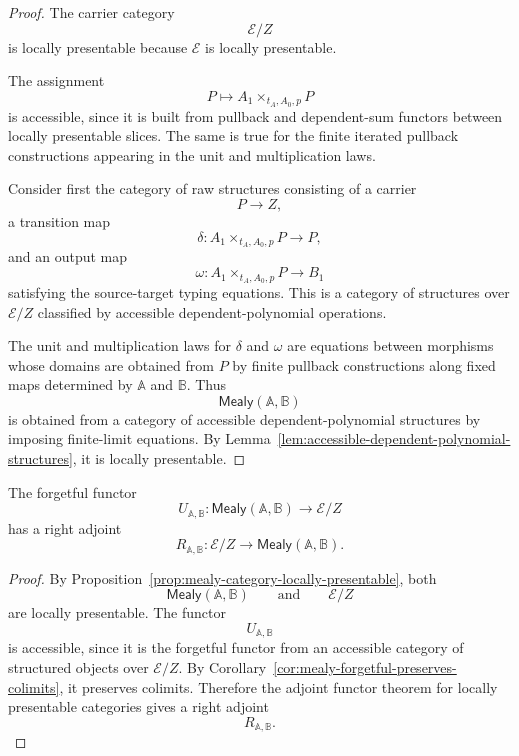 \begin{proof}
The carrier category
\[
\mathcal E/Z
\]
is locally presentable because \(\mathcal E\) is locally presentable.

The assignment
\[
P\longmapsto A_1\times_{t_A,A_0,p}P
\]
is accessible, since it is built from pullback and dependent-sum functors
between locally presentable slices. The same is true for the finite iterated
pullback constructions appearing in the unit and multiplication laws.

Consider first the category of raw structures consisting of a carrier
\[
P\to Z,
\]
a transition map
\[
\delta:A_1\times_{t_A,A_0,p}P\to P,
\]
and an output map
\[
\omega:A_1\times_{t_A,A_0,p}P\to B_1
\]
satisfying the source-target typing equations. This is a category of
structures over \(\mathcal E/Z\) classified by accessible
dependent-polynomial operations.

The unit and multiplication laws for \(\delta\) and \(\omega\) are equations
between morphisms whose domains are obtained from \(P\) by finite pullback
constructions along fixed maps determined by \(\mathbb A\) and \(\mathbb B\).
Thus
\[
\mathsf{Mealy}(\mathbb A,\mathbb B)
\]
is obtained from a category of accessible dependent-polynomial structures by
imposing finite-limit equations. By
Lemma~\ref{lem:accessible-dependent-polynomial-structures}, it is locally
presentable.
\end{proof}

\begin{theorem}
\label{thm:cofree-mealy-systems}
The forgetful functor
\[
U_{\mathbb A,\mathbb B}:
\mathsf{Mealy}(\mathbb A,\mathbb B)
\to
\mathcal E/Z
\]
has a right adjoint
\[
R_{\mathbb A,\mathbb B}:
\mathcal E/Z
\to
\mathsf{Mealy}(\mathbb A,\mathbb B).
\]
\end{theorem}

\begin{proof}
By Proposition~\ref{prop:mealy-category-locally-presentable}, both
\[
\mathsf{Mealy}(\mathbb A,\mathbb B)
\qquad\text{and}\qquad
\mathcal E/Z
\]
are locally presentable. The functor
\[
U_{\mathbb A,\mathbb B}
\]
is accessible, since it is the forgetful functor from an accessible category
of structured objects over \(\mathcal E/Z\). By
Corollary~\ref{cor:mealy-forgetful-preserves-colimits}, it preserves
colimits. Therefore the adjoint functor theorem for locally presentable
categories gives a right adjoint
\[
R_{\mathbb A,\mathbb B}.
\]
\end{proof}

